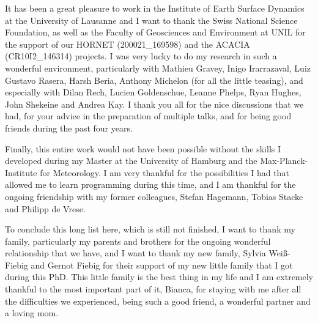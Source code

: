 \documentclass[
11pt, %
english, %
singlespacing, %
headsepline, %
]{MastersDoctoralThesis} %
\begin{document}
\begin{NoHyper}
\begin{acknowledgements}
 It has been a great pleasure to work in the Institute of Earth Surface Dynamics at the University of Lausanne and I want to thank the Swiss National Science Foundation, as well as the Faculty of Geosciences and Environment at UNIL for the support of our HORNET (200021\_169598) and the ACACIA (CR10I2\_146314) projects. I was very lucky to do my research in such a wonderful environment, particularly with Mathieu Gravey, Inigo Irarrazaval, Luiz Gustavo Rasera, Harsh Beria, Anthony Michelon (for all the little teasing), and especially with Dilan Rech, Lucien Goldenschue, Leanne Phelps, Ryan Hughes, John Shekeine and Andrea Kay. I thank you all for the nice discussions that we had, for your advice in the preparation of multiple talks, and for being good friends during the past four years.

 Finally, this entire work would not have been possible without the skills I developed during my Master at the University of Hamburg and the Max-Planck-Institute for Meteorology. I am very thankful for the possibilities I had that allowed me to learn programming during this time, and I am thankful for the ongoing friendship with my former colleagues, Stefan Hagemann, Tobias Stacke and Philipp de Vrese. 

 To conclude this long list here, which is still not finished, I want to thank my family, particularly my parents and brothers for the ongoing wonderful relationship that we have, and I want to thank my new family, Sylvia Weiß-Fiebig and Gernot Fiebig for their support of my new little family that I got during this PhD. This little family is the best thing in my life and I am extremely thankful to the most important part of it, Bianca, for staying with me after all the difficulties we experienced, being such a good friend, a wonderful partner and a loving mom.
\end{acknowledgements}




\tableofcontents %


\end{NoHyper}
\end{document}

